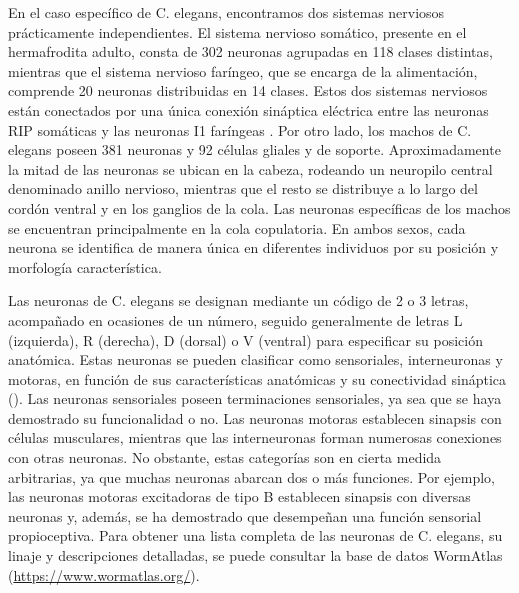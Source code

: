 En el caso específico de C. elegans, encontramos dos sistemas nerviosos prácticamente independientes. El sistema nervioso somático, presente en el hermafrodita adulto, consta de 302 neuronas agrupadas en 118 clases distintas, mientras que el sistema nervioso faríngeo, que se encarga de la alimentación, comprende 20 neuronas distribuidas en 14 clases. Estos dos sistemas nerviosos están conectados por una única conexión sináptica eléctrica entre las neuronas RIP somáticas y las neuronas I1 faríngeas \cite{fang-yen_illuminating_2015}. Por otro lado, los machos de C. elegans poseen 381 neuronas y 92 células gliales y de soporte. Aproximadamente la mitad de las neuronas se ubican en la cabeza, rodeando un neuropilo central denominado anillo nervioso, mientras que el resto se distribuye a lo largo del cordón ventral y en los ganglios de la cola. Las neuronas específicas de los machos se encuentran principalmente en la cola copulatoria. En ambos sexos, cada neurona se identifica de manera única en diferentes individuos por su posición y morfología característica.

Las neuronas de C. elegans se designan mediante un código de 2 o 3 letras, acompañado en ocasiones de un número, seguido generalmente de letras L (izquierda), R (derecha), D (dorsal) o V (ventral) para especificar su posición anatómica. Estas neuronas se pueden clasificar como sensoriales, interneuronas y motoras, en función de sus características anatómicas y su conectividad sináptica (). Las neuronas sensoriales poseen terminaciones sensoriales, ya sea que se haya demostrado su funcionalidad o no. Las neuronas motoras establecen sinapsis con células musculares, mientras que las interneuronas forman numerosas conexiones con otras neuronas. No obstante, estas categorías son en cierta medida arbitrarias, ya que muchas neuronas abarcan dos o más funciones. Por ejemplo, las neuronas motoras excitadoras de tipo B establecen sinapsis con diversas neuronas y, además, se ha demostrado que desempeñan una función sensorial propioceptiva. Para obtener una lista completa de las neuronas de C. elegans, su linaje y descripciones detalladas, se puede consultar la base de datos WormAtlas (\url{https://www.wormatlas.org/}).


